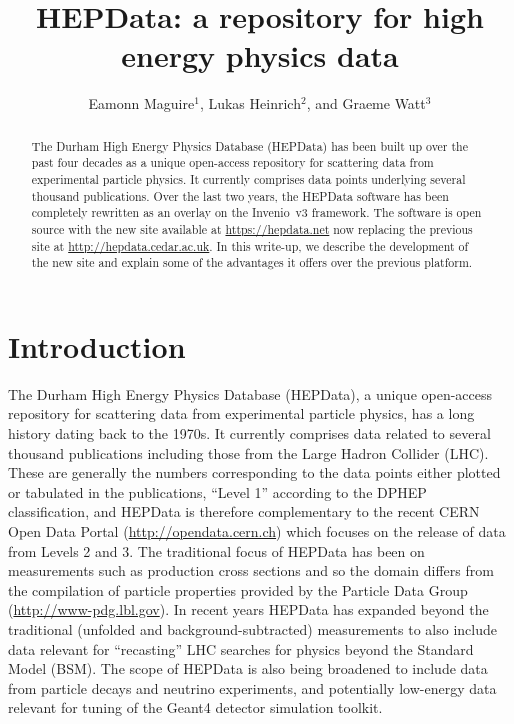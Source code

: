 \documentclass[a4paper]{jpconf}
\begin{document}
\title{HEPData: a repository for high energy physics data}

\author{Eamonn Maguire$^1$, Lukas Heinrich$^2$, and Graeme Watt$^3$}
\address{$^1$ CERN, Geneva, Switzerland}
\address{$^2$ Department of Physics, New York University, New York, USA}
\address{$^3$ IPPP, Department of Physics, Durham University, Durham, UK}


\begin{abstract}
  The Durham High Energy Physics Database (HEPData) has been built up over the past four decades as a unique open-access repository for scattering data from experimental particle physics.  It currently comprises data points underlying several thousand publications.  Over the last two years, the HEPData software has been completely rewritten as an overlay on the Invenio~v3 framework.  The software is open source with the new site available at \url{https://hepdata.net} now replacing the previous site at \url{http://hepdata.cedar.ac.uk}.  In this write-up, we describe the development of the new site and explain some of the advantages it offers over the previous platform.
\end{abstract}

\section{Introduction}

The Durham High Energy Physics Database (HEPData), a unique open-access repository for scattering data from experimental particle physics, has a long history dating back to the 1970s.  It currently comprises data related to several thousand publications including those from the Large Hadron Collider (LHC).  These are generally the numbers corresponding to the data points either plotted or tabulated in the publications, ``Level 1'' according to the DPHEP~\cite{Mount:2009aa} classification, and HEPData is therefore complementary to the recent CERN Open Data Portal (\url{http://opendata.cern.ch}) which focuses on the release of data from Levels 2 and 3.  The traditional focus of HEPData has been on measurements such as production cross sections and so the domain differs from the compilation of particle properties provided by the Particle Data Group (\url{http://www-pdg.lbl.gov}).  In recent years HEPData has expanded beyond the traditional (unfolded and background-subtracted) measurements to also include data relevant for ``recasting'' LHC searches for physics beyond the Standard Model (BSM).  The scope of HEPData is also being broadened to include data from particle decays and neutrino experiments, and potentially low-energy data relevant for tuning of the Geant4 detector simulation toolkit.
\end{document}
